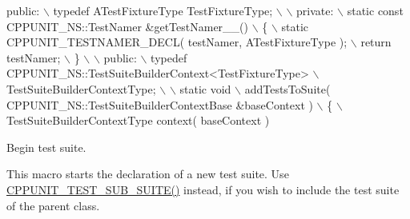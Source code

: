 \begin{DoxyCode}
\textcolor{keyword}{public}:                                                                   \(\backslash\)
    typedef ATestFixtureType TestFixtureType;                               \(\backslash\)
                                                                            \(\backslash\)
  private:                                                                  \(\backslash\)
    static \textcolor{keyword}{const} CPPUNIT\_NS::TestNamer &getTestNamer\_\_()                    \(\backslash\)
    \{                                                                       \(\backslash\)
      static CPPUNIT\_TESTNAMER\_DECL( testNamer, ATestFixtureType );         \(\backslash\)
      return testNamer;                                                     \(\backslash\)
    \}                                                                       \(\backslash\)
                                                                            \(\backslash\)
  public:                                                                   \(\backslash\)
    typedef CPPUNIT\_NS::TestSuiteBuilderContext<TestFixtureType>            \(\backslash\)
                TestSuiteBuilderContextType;                                \(\backslash\)
                                                                            \(\backslash\)
    static void                                                             \(\backslash\)
    addTestsToSuite( CPPUNIT\_NS::TestSuiteBuilderContextBase &baseContext ) \(\backslash\)
    \{                                                                       \(\backslash\)
      TestSuiteBuilderContextType context( baseContext )
\end{DoxyCode}


Begin test suite. 

This macro starts the declaration of a new test suite. Use \hyperlink{group___writing_test_fixture_gae19f30ade82172cf6c3ff297367a10c2}{C\+P\+P\+U\+N\+I\+T\+\_\+\+T\+E\+S\+T\+\_\+\+S\+U\+B\+\_\+\+S\+U\+I\+T\+E()} instead, if you wish to include the test suite of the parent class.


